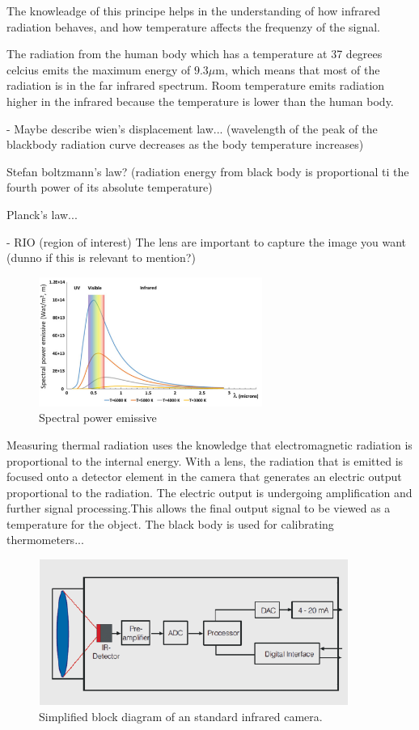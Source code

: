 The knowleadge of this principe helps in the understanding of how infrared radiation behaves, and how temperature affects the frequenzy of the signal. 

The radiation from the human body which has a temperature at 37 degrees celcius emits the maximum energy of $9.3 \mu$m, which means that most of the radiation is in the far infrared spectrum. Room temperature emits radiation higher in the infrared because the temperature is lower than the human body.

- Maybe describe wien's displacement law... (wavelength of the peak of the blackbody radiation curve decreases as the body temperature increases)

Stefan boltzmann's law? (radiation energy from black body is proportional ti the fourth power of its absolute temperature)

Planck's law...

- RIO (region of interest)
The lens are important to capture the image you want (dunno if this is relevant to mention?)

\begin{figure}[H]
	\centering	\includegraphics[width=0.65\textwidth]{figures/Spectral_power_emissive}
	\caption{Spectral power emissive}
	\label{fig:Spectral}
\end{figure} \vspace{-.3cm}

Measuring thermal radiation uses the knowledge that electromagnetic radiation is proportional to the internal energy. With a lens, the radiation that is emitted is focused onto a detector element in the camera that generates an electric output proportional to the radiation. The electric output is undergoing amplification and further signal processing.This allows the final output signal to be viewed as a temperature for the object. \cite{optris2009}
The black body is used for calibrating thermometers...

\begin{figure}[H]                                         
	\includegraphics[width=.55\textwidth]{figures/IR_cam}  
	\caption{Simplified block diagram of an standard infrared camera.\cite{optris2009}}
	\label{fig:em_spectrum}  
\end{figure} 


